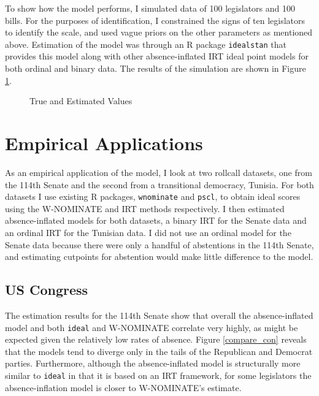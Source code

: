 	To show how the model performs, I simulated data of 100 legislators and 100 bills. For the purposes of identification, I constrained the signs of ten legislators to identify the scale, and used vague priors on the other parameters as mentioned above. Estimation of the model was through an R package \texttt{idealstan} that provides this model along with other absence-inflated IRT ideal point models for both ordinal and binary data. The results of the simulation are shown in Figure \ref{sim_results}.
	
	\begin{figure}
		\caption{True and Estimated Values}\label{sim_results}
	\end{figure} 
	
	
	
	\section*{Empirical Applications}
	
	As an empirical application of the model, I look at two rollcall datasets, one from the 114th Senate and the second from a transitional democracy, Tunisia. For both datasets I use existing R packages, \texttt{wnominate} and \texttt{pscl}, to obtain ideal scores using the W-NOMINATE and IRT methods respectively. I then estimated absence-inflated models for both datasets, a binary IRT for the Senate data and an ordinal IRT for the Tunisian data. I did not use an ordinal model for the Senate data because there were only a handful of abstentions in the 114th Senate, and estimating cutpoints for abstention would make little difference to the model. 
	
	\subsection*{US Congress}
	
	The estimation results for the 114th Senate show that overall the absence-inflated model and both \texttt{ideal} and W-NOMINATE correlate very highly, as might be expected given the relatively low rates of absence. Figure \ref{compare_con} reveals that the models tend to diverge only in the tails of the Republican and Democrat parties. Furthermore, although the absence-inflated model is structurally more similar to \texttt{ideal} in that it is based on an IRT framework, for some legislators the absence-inflation model is closer to W-NOMINATE's estimate. 
	
